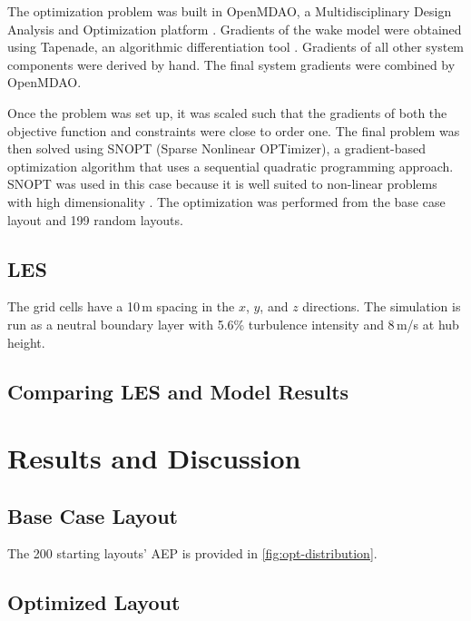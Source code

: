 \documentclass[conf]{new-aiaa}
\begin{document}
{The optimization problem was built in OpenMDAO, a Multidisciplinary Design Analysis and Optimization platform  \cite{gray2010_OpenMDAO}. Gradients of the wake model were obtained using Tapenade, an algorithmic differentiation tool \cite{tapenade2013}. Gradients of all other system components were derived by hand. The final system gradients were combined by OpenMDAO. 

Once the problem was set up, it was scaled such that the gradients of both the objective function and constraints were close to order one. The final problem was then solved using SNOPT (Sparse Nonlinear OPTimizer), a gradient-based optimization algorithm that uses a sequential quadratic programming approach.  SNOPT was used in this case because it is well suited to non-linear problems with high dimensionality \cite{gill2005}. The optimization was performed from the base case layout and 199 random layouts.  

\subsection{LES}
 The grid cells have a 10\,m spacing in the $x$, $y$, and $z$ directions.  The simulation is run as a neutral boundary layer with 5.6\% turbulence intensity and 8\,m/s at hub height.



\subsection{Comparing LES and Model Results}



\section{Results and Discussion}

\subsection{Base Case Layout} 
The 200 starting layouts' AEP is provided in \cref{fig:opt-distribution}.

\subsection{Optimized Layout} 

}
\end{document}
